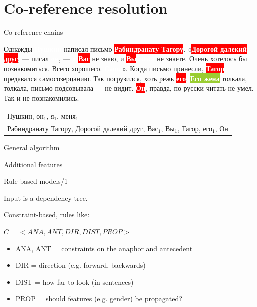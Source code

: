\documentclass[dvipsnames, 10pt, compress]{beamer}
\newcommand{\redfillbox}[1]{\colorbox{red}{\textcolor{white}{{\bf #1}}}}
\newcommand{\bluefillbox}[1]{\colorbox{ProcessBlue}{\textcolor{white}{{\bf #1}}}}
\newcommand{\greenfillbox}[1]{\colorbox{YellowGreen}{\textcolor{white}{{\bf #1}}}}
\begin{document}
\section{Co-reference resolution}


\begin{frame}


\end{frame}


\begin{frame}{Co-reference chains}

Однажды \bluefillbox{Пушкин} написал письмо \redfillbox{Рабиндранату Тагору}. 
«\redfillbox{Дорогой далекий друг}, — писал \bluefillbox{он}, — \bluefillbox{я} \redfillbox{Вас} не знаю, и \redfillbox{Вы} \bluefillbox{меня} не знаете.
Очень хотелось бы познакомиться. Всего хорошего. \bluefillbox{Саша}».
Когда письмо принесли, \redfillbox{Тагор} предавался самосозерцанию. 
Так погрузился, хоть режь \redfillbox{его}. 
\greenfillbox{Его жена} толкала, толкала, письмо подсовывала — не видит. 
\redfillbox{Он}, правда, по-русски читать не умел. Так и не познакомились.

\begin{tabular}{l}
{ Пушкин, он$_1$, я$_1$, меня$_1$ } \\ 
{ Рабиндранату Тагору, Дорогой далекий друг, Вас$_1$, Вы$_1$, Тагор, его$_1$, Он} \\
\end{tabular}

\end{frame}

\begin{frame}{General algorithm}

\end{frame}


\begin{frame}{Additional features}

\end{frame}


\begin{frame}{Rule-based models/1} %

Input is a dependency tree.

Constraint-based, rules like:

$C = <ANA,  ANT,  DIR, DIST, PROP>$

\begin{itemize}
  \item ANA, ANT = constraints on the anaphor and antecedent
  \item DIR = direction (e.g. forward, backwards)
  \item DIST = how far to look (in sentences)
  \item PROP = should features (e.g. gender) be propagated?
\end{itemize}

\end{frame}
\end{document}
